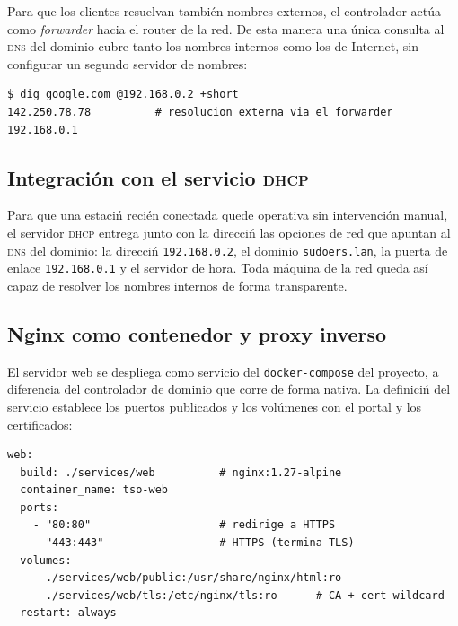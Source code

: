 Para que los clientes resuelvan tambi\'en nombres externos, el controlador
act\'ua como \textit{forwarder} hacia el router de la red. De esta manera una
\'unica consulta al \textsc{dns} del dominio cubre tanto los nombres internos
como los de Internet, sin configurar un segundo servidor de nombres:

\begin{lstlisting}[style=terminal]
$ dig google.com @192.168.0.2 +short
142.250.78.78          # resolucion externa via el forwarder 192.168.0.1
\end{lstlisting}


\subsection{Integraci\'on con el servicio \textsc{dhcp}}

Para que una estaci\'n reci\'en conectada quede operativa sin intervenci\'on
manual, el servidor \textsc{dhcp} entrega junto con la direcci\'n las opciones
de red que apuntan al \textsc{dns} del dominio: la direcci\'n
\texttt{192.168.0.2}, el dominio \texttt{sudoers.lan}, la puerta de enlace
\texttt{192.168.0.1} y el servidor de hora. Toda m\'aquina de la red queda
as\'i capaz de resolver los nombres internos de forma transparente.

\subsection{Nginx como contenedor y proxy inverso}

El servidor web se despliega como servicio del \texttt{docker-compose} del
proyecto, a diferencia del controlador de dominio que corre de forma
nativa. La definici\'n del servicio establece los puertos publicados y los
vol\'umenes con el portal y los certificados:

\begin{lstlisting}[style=terminal]
web:
  build: ./services/web          # nginx:1.27-alpine
  container_name: tso-web
  ports:
    - "80:80"                    # redirige a HTTPS
    - "443:443"                  # HTTPS (termina TLS)
  volumes:
    - ./services/web/public:/usr/share/nginx/html:ro
    - ./services/web/tls:/etc/nginx/tls:ro      # CA + cert wildcard
  restart: always
\end{lstlisting}

